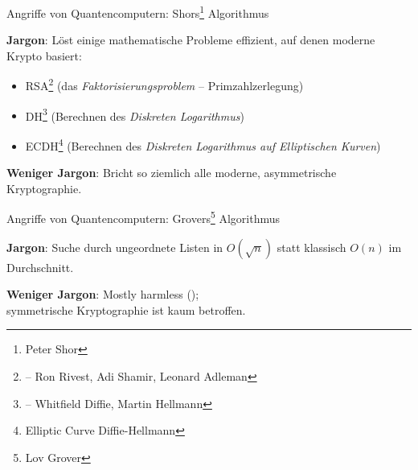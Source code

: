 \documentclass[german]{rosenpass-beamer}
\begin{document}
\begin{frame}{Angriffe von Quantencomputern: Shors\footnote{Peter Shor} Algorithmus}

\textbf{Jargon}: Löst einige mathematische Probleme effizient, auf denen moderne Krypto basiert:




\begin{itemize}
    \item RSA\footnote{ -- Ron Rivest, Adi Shamir, Leonard Adleman} (das \emph{Faktorisierungsproblem} – Primzahlzerlegung)
    \item DH\footnote{ -- Whitfield Diffie, Martin Hellmann} (Berechnen des \emph{Diskreten Logarithmus})
    \item ECDH\footnote{Elliptic Curve Diffie-Hellmann} (Berechnen des \emph{Diskreten Logarithmus auf Elliptischen Kurven})
\end{itemize}


\textbf{Weniger Jargon}: Bricht so ziemlich alle moderne, asymmetrische Kryptographie.

\end{frame}

\begin{frame}{Angriffe von Quantencomputern: Grovers\footnote{Lov Grover} Algorithmus}

\textbf{Jargon}: Suche durch ungeordnete Listen in $O(\sqrt{n})$ statt klassisch $O(n)$ im Durchschnitt.

\vspace{5mm}


\textbf{Weniger Jargon}: Mostly harmless ();\\
symmetrische Kryptographie ist kaum betroffen.

\end{frame}
\end{document}
